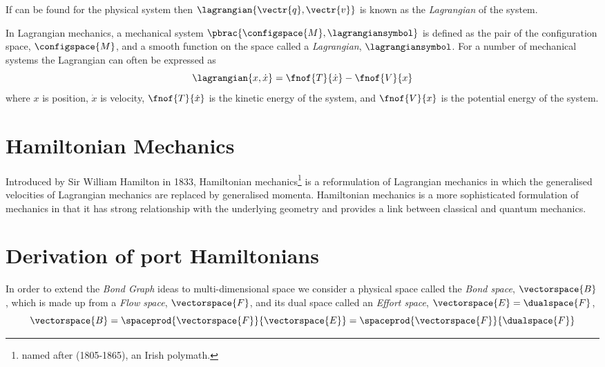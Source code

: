 If  can be found for
the physical system then $\lagrangian{\vectr{q},\vectr{v}}$ is known
as the \emph{Lagrangian} of the system.

In Lagrangian mechanics, a mechanical system
$\pbrac{\configspace{M},\lagrangiansymbol}$ is defined as the pair of
the configuration space, $\configspace{M}$, and a smooth function on
the space called a \emph{Lagrangian},
$\lagrangiansymbol$. For a number of mechanical systems the Lagrangian
can often be expressed as
\begin{equation}
  \lagrangian{x,\dot{x}} = \fnof{T}{\dot{x}} - \fnof{V}{x}
\end{equation}
where $x$ is position, $\dot{x}$ is velocity, $\fnof{T}{\dot{x}}$ is
the kinetic energy of the system, and $\fnof{V}{x}$ is the potential
energy of the system.

\section{Hamiltonian Mechanics}
\label{sec:PHHamiltonianMechanics}

Introduced by Sir William Hamilton in 1833, Hamiltonian
mechanics\footnote{named after
 (1805-1865), an Irish polymath.} is a reformulation of Lagrangian mechanics in which the generalised
velocities of Lagrangian mechanics are replaced by generalised
momenta. Hamiltonian mechanics is a more sophisticated formulation of
mechanics in that it has strong relationship with the underlying
geometry and provides a link between classical and quantum mechanics.

\section{Derivation of port Hamiltonians}
\label{sec:PHDerivation}

In order to extend the \emph{Bond Graph} ideas to multi-dimensional space we
consider a physical space called the \emph{Bond space}, $\vectorspace{B}$, which
is made up from a \emph{Flow space}, $\vectorspace{F}$, and its dual space
called an \emph{Effort space}, $\vectorspace{E}=\dualspace{F}$, \ie
\begin{equation}
  \vectorspace{B}=\spaceprod{\vectorspace{F}}{\vectorspace{E}}=\spaceprod{\vectorspace{F}}{\dualspace{F}}
\end{equation}

